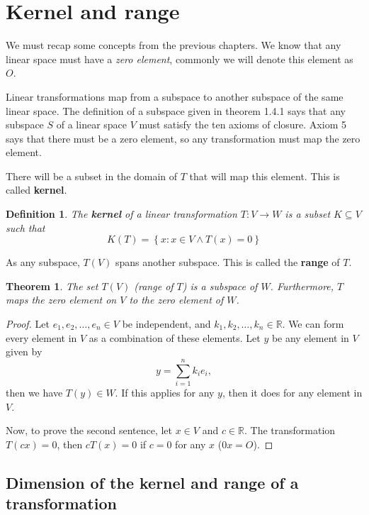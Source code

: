 \documentclass{book}
\newtheorem{theorem}{Theorem}[section]
\newtheorem{definition}{Definition}[section]
\begin{document}
\section{Kernel and range}

We must recap some concepts from the previous chapters. We know that any linear
space must have a \textit{zero element}, commonly we will denote this element
as $O$.

Linear transformations map from a subspace to another subspace of the same
linear space. The definition of a subspace given in theorem 1.4.1 says that any
subspace $S$ of a linear space $V$ must satisfy the ten axioms of closure.
Axiom 5 says that there must be a zero element, so any transformation must map
the zero element.

There will be a subset in the domain of $T$ that will map this element. This is
called \textbf{kernel}.

\begin{definition}
    The \textbf{kernel} of a linear transformation $T: V\to W$ is a subset $K\subseteq V$ such that
    \begin{equation}
        K(T) = \left\{x: x\in V \wedge T(x)=0\right\}
    \end{equation}
\end{definition}

As any subspace, $T(V)$ spans another subspace. This is called the
\textbf{range} of $T$.

\begin{theorem}
    The set $T(V)$ (range of $T$) is a subspace of $W$.
    Furthermore, $T$ maps the zero element on $V$ to the zero element of $W$.
\end{theorem}

\begin{proof}
    Let $e_1,e_2,\dots,e_n\in V$ be independent, and $k_1,k_2,\dots,k_n\in \mathbb{R}$.
    We can form every element in $V$ as a combination of these elements. Let $y$ be any
    element in $V$ given by
    \begin{equation*}
        y = \sum_{i=1}^{n}{k_i e_i},
    \end{equation*}
    then we have $T(y)\in W$. If this applies for any $y$, then it does for any element in $V$.

    Now, to prove the second sentence, let $x\in V$ and $c\in \mathbb{R}$. The
    transformation $T(cx)=0$, then $cT(x) = 0$ if $c=0$ for any $x$ ($0x=O$).
\end{proof}

\subsection{Dimension of the kernel and range of a transformation}
\end{document}
